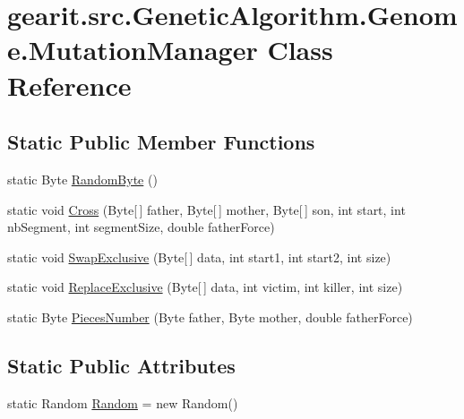 \hypertarget{classgearit_1_1src_1_1_genetic_algorithm_1_1_genome_1_1_mutation_manager}{\section{gearit.\+src.\+Genetic\+Algorithm.\+Genome.\+Mutation\+Manager Class Reference}
\label{classgearit_1_1src_1_1_genetic_algorithm_1_1_genome_1_1_mutation_manager}
}
\subsection*{Static Public Member Functions}
\begin{DoxyCompactItemize}
\item 
static Byte \hyperlink{classgearit_1_1src_1_1_genetic_algorithm_1_1_genome_1_1_mutation_manager_ab9c0c37beeab82f4505774e4571e3b21}{Random\+Byte} ()
\item 
static void \hyperlink{classgearit_1_1src_1_1_genetic_algorithm_1_1_genome_1_1_mutation_manager_a356cf51abe0934a8d2bb2ff845f07847}{Cross} (Byte\mbox{[}$\,$\mbox{]} father, Byte\mbox{[}$\,$\mbox{]} mother, Byte\mbox{[}$\,$\mbox{]} son, int start, int nb\+Segment, int segment\+Size, double father\+Force)
\item 
static void \hyperlink{classgearit_1_1src_1_1_genetic_algorithm_1_1_genome_1_1_mutation_manager_a33a7987c8fc25d68ce06de157058b38f}{Swap\+Exclusive} (Byte\mbox{[}$\,$\mbox{]} data, int start1, int start2, int size)
\item 
static void \hyperlink{classgearit_1_1src_1_1_genetic_algorithm_1_1_genome_1_1_mutation_manager_a8d508d264c346b7ba07a869ac4ec9e5e}{Replace\+Exclusive} (Byte\mbox{[}$\,$\mbox{]} data, int victim, int killer, int size)
\item 
static Byte \hyperlink{classgearit_1_1src_1_1_genetic_algorithm_1_1_genome_1_1_mutation_manager_a78c8b539b2865b4a19f49e5778d11e02}{Pieces\+Number} (Byte father, Byte mother, double father\+Force)
\end{DoxyCompactItemize}
\subsection*{Static Public Attributes}
\begin{DoxyCompactItemize}
\item 
static Random \hyperlink{classgearit_1_1src_1_1_genetic_algorithm_1_1_genome_1_1_mutation_manager_a192811613074f1cc58f1a357899f7ccc}{Random} = new Random()
\end{DoxyCompactItemize}


